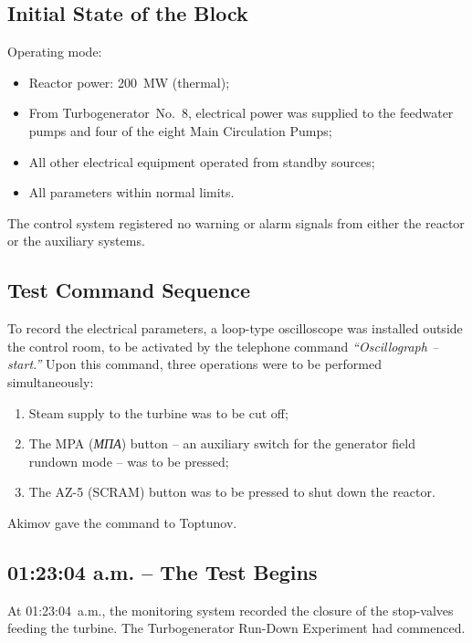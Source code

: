 \documentclass[openright]{bookest}
\begin{document}
\subsection{Initial State of the Block}

Operating mode:

\begin{itemize}
\item Reactor power: \qty{200}{\mega\watt} (thermal);
\item From Turbogenerator~No.~8, electrical power was supplied to the feedwater pumps and four of the eight Main Circulation Pumps;
\item All other electrical equipment operated from standby sources;
\item All parameters within normal limits.
\end{itemize}

The control system registered no warning or alarm signals from either the reactor or the auxiliary systems.

\subsection{Test Command Sequence}

To record the electrical parameters, a loop-type oscilloscope was installed outside the control room, to be activated by the telephone command \textit{``Oscillograph -- start.''} Upon this command, three operations were to be performed simultaneously:

\begin{enumerate}
\item Steam supply to the turbine was to be cut off;
\item The MPA (\textit{МПА}) button -- an auxiliary switch for the generator field rundown mode -- was to be pressed;
\item The AZ-5 (SCRAM) button was to be pressed to shut down the reactor.
\end{enumerate}

Akimov gave the command to Toptunov.

\subsection{01:23:04 a.m. -- The Test Begins}

At 01:23:04~a.m., the monitoring system recorded the closure of the stop-valves feeding the turbine. The Turbogenerator Run-Down Experiment had commenced.
\end{document}
